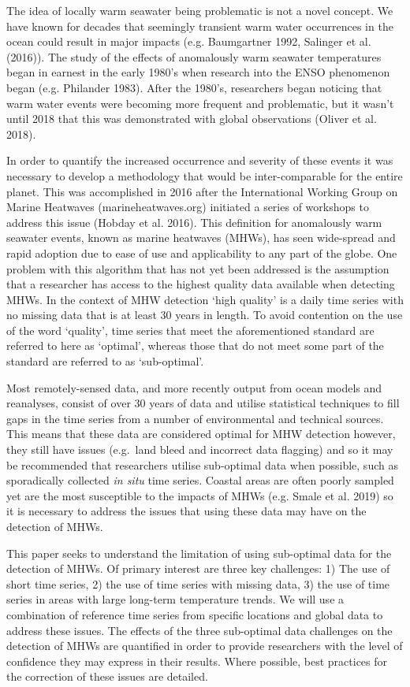 \documentclass[]{article}
\begin{document}
The idea of locally warm seawater being problematic is not a novel
concept. We have known for decades that seemingly transient warm water
occurrences in the ocean could result in major impacts (e.g. Baumgartner
1992, Salinger et al. (2016)). The study of the effects of anomalously
warm seawater temperatures began in earnest in the early 1980's when
research into the ENSO phenomenon began (e.g. Philander 1983). After the
1980's, researchers began noticing that warm water events were becoming
more frequent and problematic, but it wasn't until 2018 that this was
demonstrated with global observations (Oliver et al. 2018).

In order to quantify the increased occurrence and severity of these
events it was necessary to develop a methodology that would be
inter-comparable for the entire planet. This was accomplished in 2016
after the International Working Group on Marine Heatwaves
(marineheatwaves.org) initiated a series of workshops to address this
issue (Hobday et al. 2016). This definition for anomalously warm
seawater events, known as marine heatwaves (MHWs), has seen wide-spread
and rapid adoption due to ease of use and applicability to any part of
the globe. One problem with this algorithm that has not yet been
addressed is the assumption that a researcher has access to the highest
quality data available when detecting MHWs. In the context of MHW
detection `high quality' is a daily time series with no missing data
that is at least 30 years in length. To avoid contention on the use of
the word `quality', time series that meet the aforementioned standard
are referred to here as `optimal', whereas those that do not meet some
part of the standard are referred to as `sub-optimal'.

Most remotely-sensed data, and more recently output from ocean models
and reanalyses, consist of over 30 years of data and utilise statistical
techniques to fill gaps in the time series from a number of
environmental and technical sources. This means that these data are
considered optimal for MHW detection however, they still have issues
(e.g.~land bleed and incorrect data flagging) and so it may be
recommended that researchers utilise sub-optimal data when possible,
such as sporadically collected \emph{in situ} time series. Coastal areas
are often poorly sampled yet are the most susceptible to the impacts of
MHWs (e.g. Smale et al. 2019) so it is necessary to address the issues
that using these data may have on the detection of MHWs.

This paper seeks to understand the limitation of using sub-optimal data
for the detection of MHWs. Of primary interest are three key challenges:
1) The use of short time series, 2) the use of time series with missing
data, 3) the use of time series in areas with large long-term
temperature trends. We will use a combination of reference time series
from specific locations and global data to address these issues. The
effects of the three sub-optimal data challenges on the detection of
MHWs are quantified in order to provide researchers with the level of
confidence they may express in their results. Where possible, best
practices for the correction of these issues are detailed.
\end{document}
